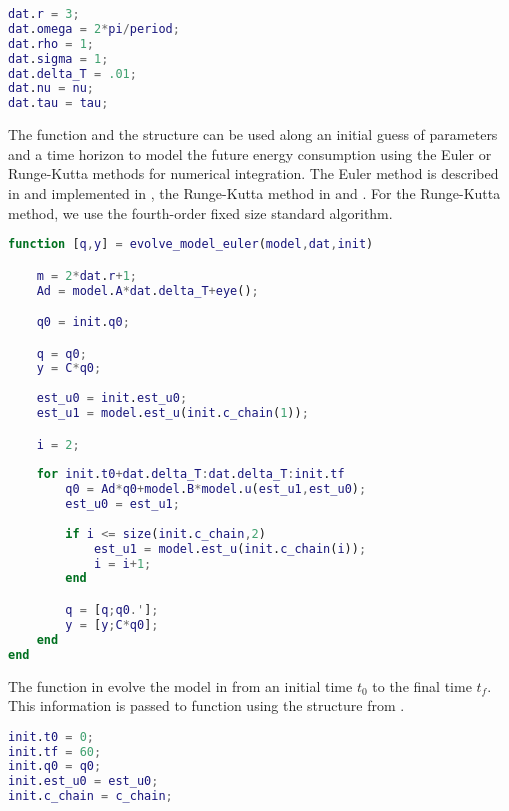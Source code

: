 \begin{lstlisting}[language=Matlab,caption={[Struct used to build the model]Struct \stt{dat} used by function \stt{build\_model} to build the model.},captionpos=b,label=lst:struct_dat]
dat.r = 3;
dat.omega = 2*pi/period;
dat.rho = 1;
dat.sigma = 1;
dat.delta_T = .01;
dat.nu = nu;
dat.tau = tau;
\end{lstlisting}

The function  and the structure  can be used along an initial guess of parameters and a time horizon to model the future energy consumption using the Euler or Runge-Kutta methods for numerical integration. The Euler method is described in  and implemented in , the Runge-Kutta method in  and . For the Runge-Kutta method, we use the fourth-order fixed size standard algorithm. 

\begin{lstlisting}[language=Matlab,caption={[Euler method for numerical integration]Euler method for numerical integration of the model.},captionpos=b,label=lst:euler]
function [q,y] = evolve_model_euler(model,dat,init)

    m = 2*dat.r+1;
    Ad = model.A*dat.delta_T+eye();

    q0 = init.q0;

    q = q0;
    y = C*q0;
    
    est_u0 = init.est_u0;
    est_u1 = model.est_u(init.c_chain(1));

    i = 2;
    
    for init.t0+dat.delta_T:dat.delta_T:init.tf
        q0 = Ad*q0+model.B*model.u(est_u1,est_u0);
        est_u0 = est_u1;
        
        if i <= size(init.c_chain,2)
            est_u1 = model.est_u(init.c_chain(i));
            i = i+1;
        end

        q = [q;q0.'];
        y = [y;C*q0];
    end
end
\end{lstlisting}

The function  in  evolve the model in  from an initial time $t_0$ to the final time $t_f$. This information is passed to function using the structure  from .

\begin{lstlisting}[language=Matlab,caption={[Structure \stt{init} with numerical integrator's initializations]Structure \stt{init} with numerical integrator's initializations.},captionpos=b,label=lst:init]
init.t0 = 0;
init.tf = 60;
init.q0 = q0;
init.est_u0 = est_u0;
init.c_chain = c_chain;
\end{lstlisting}

